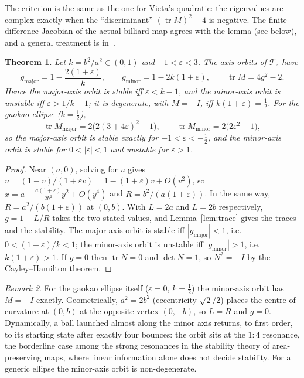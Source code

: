 \documentclass[11pt]{amsart}
\newtheorem{theorem}{Theorem}
\theoremstyle{remark}
\newtheorem{remark}[theorem]{Remark}
\begin{document}
The criterion is the same as the one for Vieta's quadratic: the eigenvalues
are complex exactly when the ``discriminant''
$(\operatorname{tr} M)^2 - 4$ is negative. The finite-difference Jacobian of
the actual billiard map agrees with the lemma (see below), and a general
treatment is in~\cite{KozlovTreshchev1991, Tabachnikov2005}.

\begin{theorem}\label{thm:axes}
Let $k = b^2/a^2 \in (0, 1)$ and $-1 < \varepsilon < 3$. The axis orbits of
$\mathcal T_\varepsilon$ have
\[
  g_{\mathrm{major}} = 1 - \frac{2(1+\varepsilon)}{k},
  \qquad
  g_{\mathrm{minor}} = 1 - 2k(1+\varepsilon),
  \qquad
  \operatorname{tr} M = 4g^2 - 2 .
\]
Hence the major-axis orbit is stable iff $\varepsilon < k - 1$, and the
minor-axis orbit is unstable iff $\varepsilon > 1/k - 1$; it is degenerate,
with $M = -I$, iff $k(1+\varepsilon) = \frac12$. For the gaokao ellipse
($k = \frac12$),
\[
  \operatorname{tr} M_{\mathrm{major}} = 2\bigl(2(3 + 4\varepsilon)^2 - 1\bigr),
  \qquad
  \operatorname{tr} M_{\mathrm{minor}} = 2\bigl(2\varepsilon^2 - 1\bigr),
\]
so the major-axis orbit is stable exactly for $-1 < \varepsilon < -\frac12$,
and the minor-axis orbit is stable for $0 < |\varepsilon| < 1$ and unstable for
$\varepsilon > 1$.
\end{theorem}

\begin{proof}
Near $(a, 0)$, solving for $u$ gives $u = (1 - v)/(1 + \varepsilon v) =
1 - (1 + \varepsilon)v + O(v^2)$, so
$x = a - \frac{a(1+\varepsilon)}{2b^2}y^2 + O(y^4)$ and
$R = b^2/(a(1+\varepsilon))$. In the same way, $R = a^2/(b(1+\varepsilon))$ at
$(0, b)$. With $L = 2a$ and $L = 2b$ respectively, $g = 1 - L/R$ takes the two
stated values, and Lemma~\ref{lem:trace} gives the traces and the stability.
The major-axis orbit is stable iff $|g_{\mathrm{major}}| < 1$, i.e.
$0 < (1 + \varepsilon)/k < 1$; the minor-axis orbit is unstable iff
$|g_{\mathrm{minor}}| > 1$, i.e. $k(1+\varepsilon) > 1$. If
$g = 0$ then $\operatorname{tr} N = 0$ and $\det N = 1$, so $N^2 = -I$ by the
Cayley--Hamilton theorem.
\end{proof}

\begin{remark}\label{rem:resonance}
For the gaokao ellipse itself ($\varepsilon = 0$, $k = \frac12$) the
minor-axis orbit has $M = -I$ exactly. Geometrically, $a^2 = 2b^2$
(eccentricity $\sqrt2/2$) places the centre of curvature at $(0, b)$ at the
opposite vertex $(0, -b)$, so $L = R$ and $g = 0$. Dynamically, a ball launched
almost along the minor axis returns, to first order, to its starting state
after exactly four bounces: the orbit sits at the $1{:}4$ resonance, the borderline case among
the strong resonances in the stability theory of area-preserving maps, where
linear information alone does not decide stability. For a generic ellipse the minor-axis orbit is non-degenerate.
\end{remark}
\end{document}
